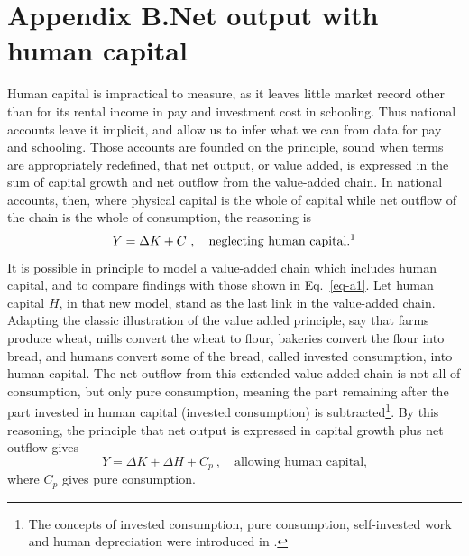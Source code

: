 \documentclass[a4paper,fleqn]{latex_styles/cas-sc}
\begin{document}
\renewcommand{\theequation}{B.\arabic{equation}}
\setcounter{equation}{0}

\hypertarget{appendix}{%
\section*{Appendix B.\hspace{0.5em}Net output with human
capital}\label{appendix}}

Human capital is impractical to measure, as it leaves little market
record other than for its rental income in pay and investment cost in schooling. Thus national accounts
leave it implicit, and allow us to infer what we can from data for pay and schooling. Those
accounts are founded on the principle, sound when terms are appropriately redefined, that net output,
or value added, is expressed in the sum of capital growth and net
outflow from the value-added chain. In national accounts, then, where
physical capital is the whole of capital while net outflow of the chain
is the whole of consumption, the reasoning is
%
\begin{equation}
Y = \Delta K + C \ , \quad \text{neglecting human capital.\footnotemark}\label{eq-a1}
\end{equation}
%
It is possible in principle to model a value-added chain which includes human
capital, and to compare findings with those shown in Eq.~\eqref{eq-a1}.
Let human capital $H$, in that new model, stand as the last link in the
value-added chain. Adapting the classic illustration of the value added
principle, say that farms produce wheat, mills convert the wheat to
flour, bakeries convert the flour into bread, and humans convert some of
the bread, called invested consumption, into human capital. The net
outflow from this extended value-added chain is not all of consumption,
but only pure consumption, meaning the part remaining after the part invested in human capital (invested consumption) is
subtracted\footnote{The concepts of invested consumption, pure consumption, self-invested work and human depreciation were introduced in \cite{schultzInvestmentHumanCapital1961}.}. By this reasoning, the principle
that net output is expressed in capital growth plus net outflow gives
%
\begin{equation} 
Y = \Delta K + \Delta H + C_{p}\ , \quad \text{allowing human capital,}\label{eq-a2} 
\end{equation}
%
where \(C_{p}\) gives pure consumption.
\end{document}
